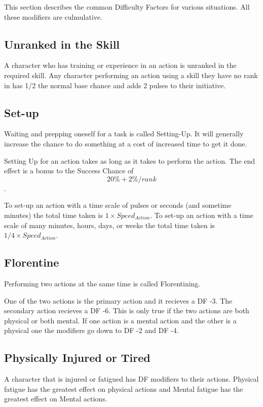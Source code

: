 This section describes the common Difficulty Factors for various 
situations. All these modifiers are culmulative.

\subsection{Unranked in the Skill}

A character who has training or experience in an action is
unranked in the required skill. Any character performing an action using 
a skill they have no rank in has 1/2 the normal base chance and adds 2 pulses to 
their initiative. 

\subsection{Set-up}

Waiting and prepping oneself for a task is called Setting-Up. It will generally increase 
the chance to do something at a cost of increased time to get it done.

Setting Up for an action takes as long as it takes to perform the action. The end effect is a
bonus to the Success Chance of \[ 20\% + 2\%/rank\]. 

To set-up an action with a time scale of pulses or seconds (and sometime minutes) the total time taken is \( 1 \times Speed_{Action} \).
To set-up an action with a time scale of many minutes, hours, days, or weeks the total time taken is \( 1/4 \times Speed_{Action} \).  

\subsection{Florentine}

Performing two actions at the same time is called Florentining.

One of the two actions is the primary action and it recieves a 
DF -3. The secondary action recieves a DF -6. This is only true 
if the two actions are both physical or both mental. If one 
action is a mental action and the other is a physical one the modifiers
go down to DF -2 and DF -4.



\subsection{Physically Injured or Tired}

A character that is injured or fatigued has DF modifiers to 
their actions. Physical fatigue has the greatest effect on physical actions 
and Mental fatigue has the greatest effect on Mental actions.


